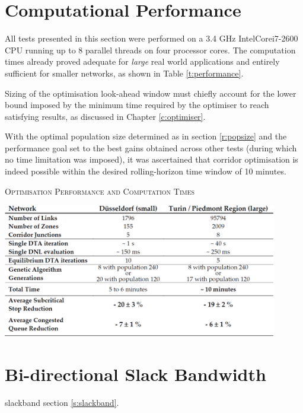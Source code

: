 \section{Computational Performance} \label{res:performance}
All tests presented in this section were performed on a 3.4 GHz Intel\textregistered Core\texttrademark i7-2600 CPU running up to 8 parallel threads on four processor cores. The computation times already proved adequate for \emph{large} real world applications and entirely sufficient for smaller networks, as shown in Table \ref{t:performance}.

Sizing of the optimisation look-ahead window must chiefly account for the lower bound imposed by the minimum time required by the optimiser to reach satisfying results, as discussed in Chapter \ref{c:optimiser}.

With the optimal population size determined as in section \ref{r:popsize} and the performance goal set to the best gains obtained across other tests (during which no time limitation was imposed), it was ascertained that corridor optimisation is indeed possible within the desired rolling-horizon time window of 10 minutes.

\begin{table}[h]
\caption{\textsc{Optimisation Performance and Computation Times}} \label{t:performance}
\begin{center}
\includegraphics[width=0.9\textwidth]{PIX/RES/perftable.png}
\end{center}
\end{table}


\section{Bi-directional Slack Bandwidth}
slackband section \ref{s:slackband}.


